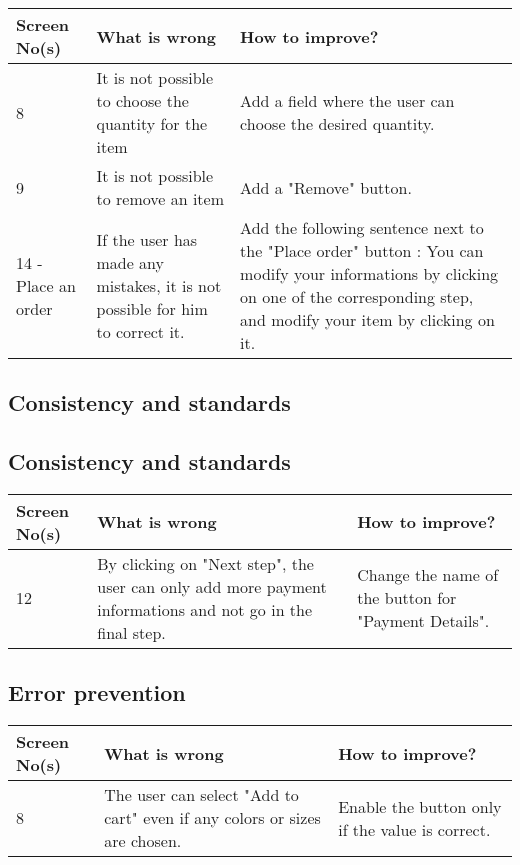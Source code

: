 \documentclass[fontsize=12pt,paper=a4]{scrartcl}
\begin{document}
\begin{table}[htdp]
\begin{center}
\begin{tabular}{|p{2cm}|p{6.5cm}|p{6.5cm}|}
\hline
\textbf{Screen No(s)} & \textbf{What is wrong} & \textbf{How to improve?} \\
\hline
8 & It is not possible to choose the quantity for the item & Add a field where the user can choose the desired quantity.\\
\hline
9 & It is not possible to remove an item & Add a "Remove" button.\\
\hline
14 - Place an order & If the user has made any mistakes, it is not possible for him to correct it. & Add the following sentence next to the "Place order" button : You can modify your informations by clicking on one of the corresponding step, and modify your item by clicking on it.\\
\hline
\end{tabular}
\end{center}
\label{3_heurisitcs_eval}
\end{table}

\subsection{Consistency and standards}
\subsection{Consistency and standards}
\begin{table}[htdp]
\begin{center}
\begin{tabular}{|p{2cm}|p{6.5cm}|p{6.5cm}|}
\hline
\textbf{Screen No(s)} & \textbf{What is wrong} & \textbf{How to improve?} \\
\hline
12 & By clicking on "Next step", the user can only add more payment informations and not go in the final step. & Change the name of the button for "Payment Details".\\
\hline
\end{tabular}
\end{center}
\label{4_heurisitcs_eval}
\end{table}

\subsection{Error prevention}
\begin{table}[htdp]
\begin{center}
\begin{tabular}{|p{2cm}|p{6.5cm}|p{6.5cm}|}
\hline
\textbf{Screen No(s)} & \textbf{What is wrong} & \textbf{How to improve?} \\
\hline
8 & The user can select "Add to cart" even if any colors or sizes are chosen. & Enable the button only if the value is correct.\\
\hline
\end{tabular}
\end{center}
\label{5_heurisitcs_eval}
\end{table}
\end{document}
